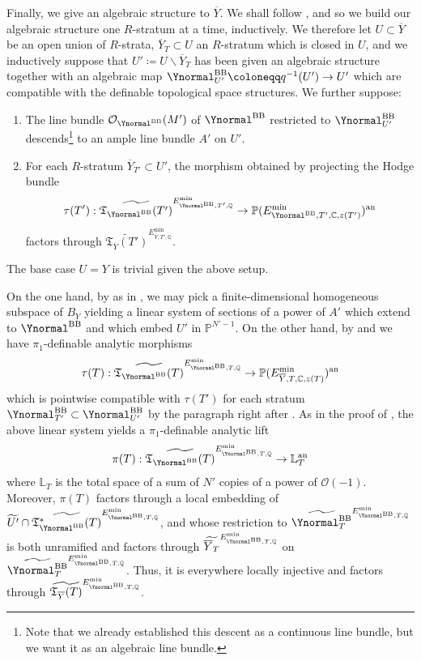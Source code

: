 \documentclass{amsart}
\newcommand{\bs}{\backslash}
\newcommand{\an}{\operatorname{an}}
\newcommand{\ol}{\overline}
\def\bL#1.{\mathbf{L}_{#1}}
\theoremstyle{definition}
\theoremstyle{remark}
\def\bQ{\mathbb{Q}}
\def\bC{\mathbb{C}}
\def\bP{\mathbb{P}}
\def\bL{\mathbb{L}}
\def\cO{\mathcal{O}}
\def\fT{\mathfrak{T}}
\def\an{\mathrm{an}}
\def\mini{\mathrm{min}}
\def\BB{\mathrm{BB}}
\def\fT{\mathfrak{T}}
\renewcommand{\bar}[1]{\ol{#1}}
\numberwithin{equation}{section}
\begin{document}
Finally, we give an algebraic structure to $\ol{Y}$. We shall follow , and so we build our algebraic structure one $R$-stratum at a time, inductively.  We therefore let $ U\subset \bar Y$ be an open union of $R$-strata, $\bar Y_T\subset U$ an $R$-stratum which is closed in $U$, and we inductively suppose that $U'\coloneqq  U\bs \bar Y_T$ has been given an algebraic structure together with an algebraic map $\Ynormal^{\BB}_{U'}\coloneqq  q^{-1}(U')\to U'$ which are compatible with the definable topological space structures.  We further suppose:
\begin{enumerate}
\item[(i)] The line bundle $\cO_{\Ynormal^\BB}(M')$ of $\Ynormal^\BB$ restricted to $\Ynormal^\BB_{U'}$ descends\footnote{Note that we already established this descent as a continuous line bundle, but we want it as an algebraic line bundle.} to an ample line bundle $A'$ on $U'$.
\item[(ii)] For each $R$-stratum $\bar Y_{T'}\subset U'$, the morphism obtained by projecting the Hodge bundle
$$\tau(T'):\widetilde{\fT_{\Ynormal^\BB}(T')}^{E^\mini_{\Ynormal^\BB,T',\bQ}}\to \bP(E^\mini_{\Ynormal^\BB,T',\bC,z(T')})^\an$$
factors through $\widetilde{\fT_{\bar Y}(T')}^{E^\mini_{\bar Y,T',\bQ}}$.

\end{enumerate}
The base case $U=Y$ is trivial given the above setup.

On the one hand, by  as in , we may pick a finite-dimensional homogeneous subspace of $B_Y$ yielding a linear system of sections of a power of $A'$ which extend to $\Ynormal^\BB$ and which embed $U'$ in $\bP^{N'-1}$.  On the other hand, by  and  we have $\pi_1$-definable analytic morphisms
$$\tau(T):\widetilde{\fT_{\Ynormal^\BB}(T)}^{E^\mini_{\Ynormal^\BB,T,\bQ}}\to \bP(E^\mini_{\bar Y,T,\bC,z(T)})^\an$$
which is pointwise compatible with $\tau(T')$ for each stratum $\Ynormal_{T'}^\BB\subset \Ynormal^\BB_{U'}$ by the paragraph right after .   
As in the proof of , the above linear system yields a $\pi_1$-definable analytic lift
\[\pi(T):\widetilde{\fT_{\Ynormal^\BB}(T)}^{E^\mini_{\Ynormal^\BB,T,\bQ}}\to \bL_T^\an\]
where $\bL_T$ is the total space of a sum of $N'$ copies of a power of $\cO(-1)$.  Moreover, $\pi(T)$ factors through a local embedding of $\widetilde{U'} \cap \widetilde{\fT^*_{\Ynormal^\BB}(T)}^{E^\mini_{\Ynormal^\BB,T,\bQ}}$, and whose restriction to $\widetilde{\Ynormal^\BB_T}^{E^\mini_{\Ynormal^\BB,T,\bQ}}$ is both unramified and factors through $\widetilde{\bar Y_T}^{E^\mini_{\Ynormal^\BB,T,\bQ}}$ on $\widetilde{\Ynormal^\BB_T}^{E^\mini_{\Ynormal^\BB,T,\bQ}}$.  Thus, it is everywhere locally injective and factors through $\widetilde{\fT_{\bar Y}(T)}^{E^\mini_{\Ynormal^\BB,T,\bQ}}$.
\end{document}
